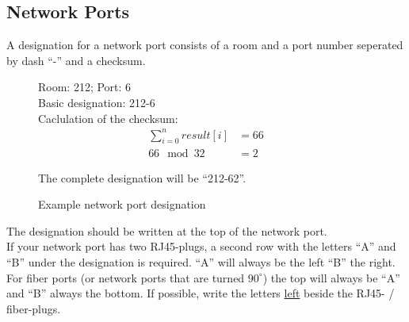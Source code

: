 %
%
%
%
%
%
%

\subsection{Network Ports}

A designation for a network port consists of a room and a port number seperated
by dash ``-'' and a checksum.

\begin{figure}[H]
	Room: 212; Port: 6 \\
	Basic designation: 212-6 \\

	Caclulation of the checksum:
	\begin{align*}
		\sum_{i=0}^{n} result[i] &= 66 \\
		66 \mod 32 &= 2
	\end{align*}

	The complete designation will be ``212-62''.

	\caption{Example network port designation}
\end{figure}

The designation should be written at the top of the network port. \\


If your network port has two RJ45-plugs, a second row with the letters ``A'' and
``B'' under the designation is required. ``A'' will always be the left ``B'' the
right.
For fiber ports (or network ports that are turned $90^{\circ}$) the top will
always be ``A'' and ``B'' always the bottom. If possible, write the letters
\underline{left} beside the RJ45- / fiber-plugs.

